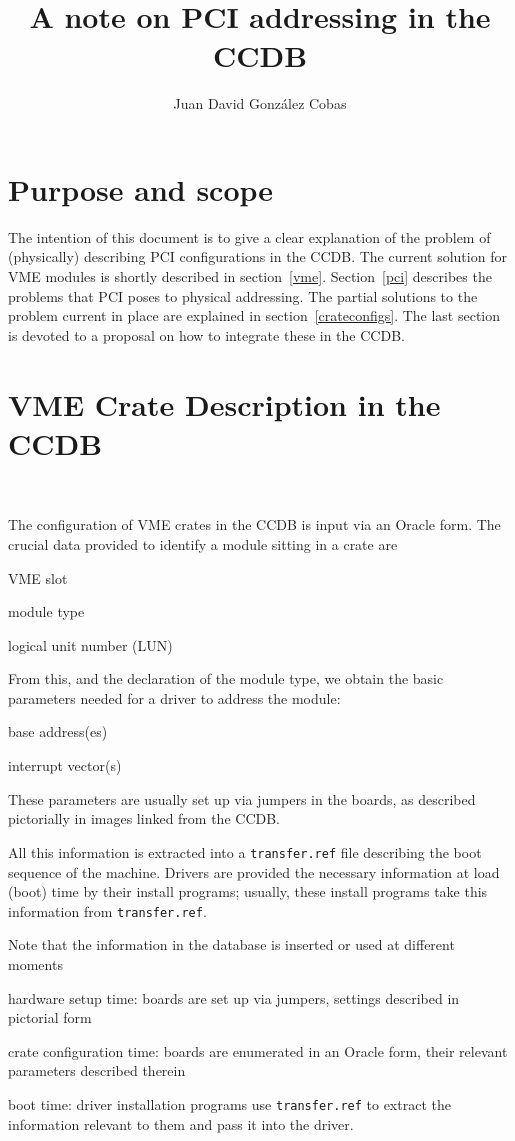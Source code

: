 \documentclass[12pt,a4paper]{article}
\title{A note on PCI addressing in the CCDB}
\author{Juan David Gonz\'alez Cobas}
\newcommand\fname[1]{\texttt{#1}}
\begin{document}
\maketitle

\section{Purpose and scope}

The intention of this document is to give a clear explanation of the
problem of (physically) describing PCI configurations in the CCDB.
The current solution for VME modules is shortly described in
section~\ref{vme}. Section~\ref{pci} describes the problems that PCI
poses to physical addressing. The partial solutions to the problem
current in place are explained in section~\ref{crateconfigs}.
The last section is devoted to a proposal on how to integrate these in
the CCDB.


\section{VME Crate Description in the CCDB}\
\label{vme}

The configuration of VME crates in the CCDB is input via an Oracle
form. The crucial data provided to identify a module sitting in a crate
are
\begin{compactitem}
\item VME slot
\item module type
\item logical unit number (LUN)
\end{compactitem}
From this, and the declaration of the module type, we obtain the basic
parameters needed for a driver to address the module:
\begin{compactitem}
\item base address(es)
\item interrupt vector(s)
\end{compactitem}
These parameters are usually set up via jumpers in the boards, as
described pictorially in images linked from the CCDB.

All this information is extracted into a \fname{transfer.ref} file
describing the boot sequence of the machine. Drivers are provided the
necessary information at load (boot) time by their install programs;
usually, these install programs take this information from
\fname{transfer.ref}.

Note that the information in the database is inserted or used at
different moments
\begin{compactitem}
\item hardware setup time: boards are set up via jumpers, settings
described in pictorial form
\item crate configuration time: boards are enumerated in an Oracle form,
their relevant parameters described therein
\item boot time: driver installation programs use \fname{transfer.ref}
to extract the information relevant to them and pass it into the driver.
\end{compactitem}
\end{document}
